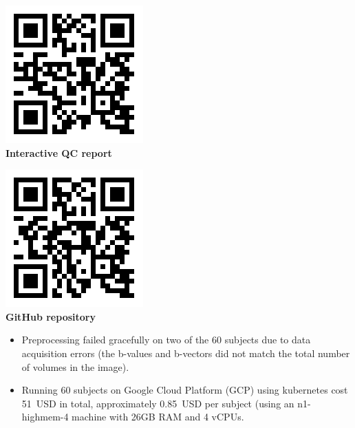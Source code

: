 \documentclass[a0, landscape]{a0poster}
\newenvironment{Figure}
  {\par\medskip\noindent\minipage{\linewidth}}
  {\endminipage\par\medskip}
\begin{document}
\begin{multicols}{3}
\begin{minipage}[b]{0.45\linewidth}
\begin{Figure}
    \centering
    \includegraphics[width=0.5\linewidth]{dmriprep_qc_dynamic_qr.png}\\
    \color{Navy} \textbf{Interactive QC report}
\end{Figure}
\end{minipage}
\begin{minipage}[b]{0.45\linewidth}
\begin{Figure}
    \centering
    \includegraphics[width=0.5\linewidth]{dmriprep_github_dynamic_qr.png}\\
    \color{Navy} \textbf{GitHub repository}
\end{Figure}
\end{minipage}

\begin{itemize}
    \item Preprocessing failed gracefully on two of the 60 subjects due to data acquisition errors (the b-values and b-vectors did not match the total number of volumes in the image).
    \item Running 60 subjects on Google Cloud Platform (GCP) using kubernetes cost 51~USD in total, approximately 0.85~USD per subject (using an n1-highmem-4 machine with 26GB RAM and 4 vCPUs.
\end{itemize}


\end{multicols}
\end{document}
